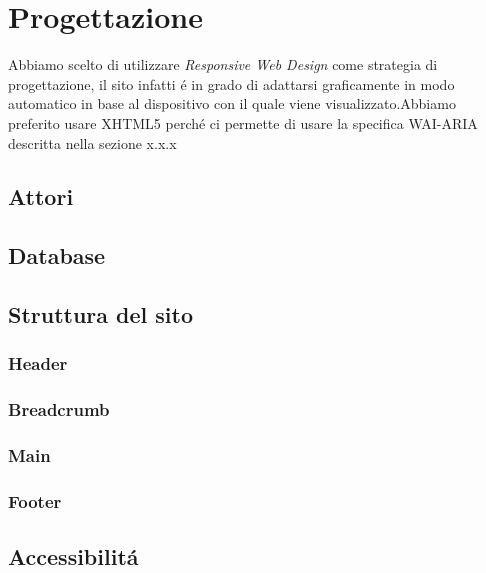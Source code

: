 \section{Progettazione}
Abbiamo scelto di utilizzare \textit{Responsive Web Design} come strategia di progettazione, il sito infatti é in grado di adattarsi graficamente in modo automatico in base al dispositivo con il quale viene visualizzato.Abbiamo  preferito  usare  XHTML5  perché  ci  permette  di  usare  la  specifica  WAI-ARIA descritta nella sezione x.x.x
\subsection{Attori}
\subsection{Database}
\subsection{Struttura del sito}
\subsubsection{Header}
\subsubsection{Breadcrumb}
\subsubsection{Main}
\subsubsection{Footer}
\subsection{Accessibilitá}
